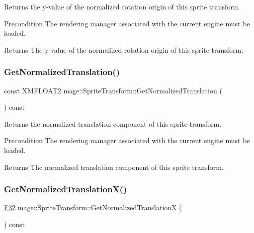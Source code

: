 Returns the y-\/value of the normalized rotation origin of this sprite transform.

\begin{DoxyPrecond}{Precondition}
The rendering manager associated with the current engine must be loaded. 
\end{DoxyPrecond}
\begin{DoxyReturn}{Returns}
The y-\/value of the normalized rotation origin of this sprite transform. 
\end{DoxyReturn}
\hypertarget{classmage_1_1_sprite_transform_a35b4a512d853e08743948f8065d1558f}{}\label{classmage_1_1_sprite_transform_a35b4a512d853e08743948f8065d1558f} 
\subsubsection{\texorpdfstring{Get\+Normalized\+Translation()}{GetNormalizedTranslation()}}
{\footnotesize\ttfamily const X\+M\+F\+L\+O\+A\+T2 mage\+::\+Sprite\+Transform\+::\+Get\+Normalized\+Translation (\begin{DoxyParamCaption}{ }\end{DoxyParamCaption}) const}

Returns the normalized translation component of this sprite transform.

\begin{DoxyPrecond}{Precondition}
The rendering manager associated with the current engine must be loaded. 
\end{DoxyPrecond}
\begin{DoxyReturn}{Returns}
The normalized translation component of this sprite transform. 
\end{DoxyReturn}
\hypertarget{classmage_1_1_sprite_transform_a31bf43cccaf564054930d80e229ebef3}{}\label{classmage_1_1_sprite_transform_a31bf43cccaf564054930d80e229ebef3} 
\subsubsection{\texorpdfstring{Get\+Normalized\+Translation\+X()}{GetNormalizedTranslationX()}}
{\footnotesize\ttfamily \hyperlink{namespacemage_aa97e833b45f06d60a0a9c4fc22ae02c0}{F32} mage\+::\+Sprite\+Transform\+::\+Get\+Normalized\+TranslationX (\begin{DoxyParamCaption}{ }\end{DoxyParamCaption}) const}


